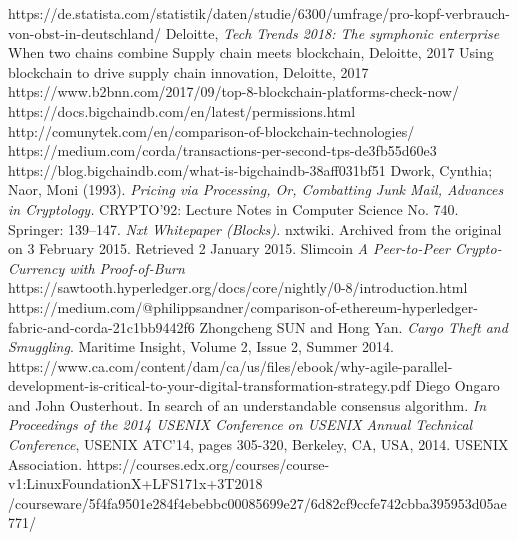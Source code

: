 \begin{thebibliography}{99}
 https://de.statista.com/statistik/daten/studie/6300/umfrage/pro-kopf-verbrauch-von-obst-in-deutschland/
 Deloitte, \textit{Tech Trends 2018: The symphonic enterprise}
When two chains combine Supply chain meets blockchain,  Deloitte, 2017
Using blockchain to drive supply chain innovation, Deloitte, 2017
https://www.b2bnn.com/2017/09/top-8-blockchain-platforms-check-now/
 https://docs.bigchaindb.com/en/latest/permissions.html
 http://comunytek.com/en/comparison-of-blockchain-technologies/
 https://medium.com/corda/transactions-per-second-tps-de3fb55d60e3
 https://blog.bigchaindb.com/what-is-bigchaindb-38aff031bf51
  Dwork, Cynthia; Naor, Moni (1993). \textit{Pricing via Processing, Or, Combatting Junk Mail, Advances in Cryptology.} CRYPTO’92: Lecture Notes in Computer Science No. 740. Springer: 139–147.
  \textit{Nxt Whitepaper (Blocks).} nxtwiki. Archived from the original on 3 February 2015. Retrieved 2 January 2015.
 Slimcoin \textit{A Peer-to-Peer Crypto-Currency with Proof-of-Burn}
 https://sawtooth.hyperledger.org/docs/core/nightly/0-8/introduction.html
 https://medium.com/@philippsandner/comparison-of-ethereum-hyperledger-fabric-and-corda-21c1bb9442f6
 Zhongcheng SUN and Hong Yan. \textit{Cargo Theft and Smuggling}. Maritime Insight, Volume 2, Issue 2, Summer 2014.
 https://www.ca.com/content/dam/ca/us/files/ebook/why-agile-parallel-development-is-critical-to-your-digital-transformation-strategy.pdf
 Diego Ongaro and John Ousterhout. In search of an understandable consensus algorithm. \textit{In Proceedings of the 2014 USENIX Conference on USENIX
Annual Technical Conference}, USENIX ATC'14, pages 305-320, Berkeley,
	CA, USA, 2014. USENIX Association.
 https://courses.edx.org/courses/course-v1:LinuxFoundationX+LFS171x+3T2018
/courseware/5f4fa9501e284f4ebebbc00085699e27/6d82cf9ccfe742cbba395953d05ae771/

\end{thebibliography}
